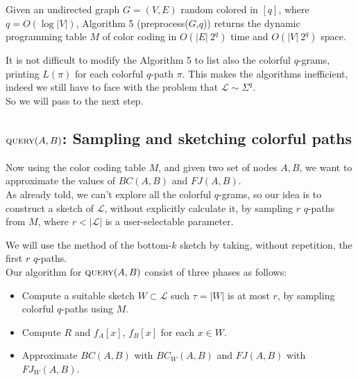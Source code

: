 \begin{lemma}
	Given an undirected graph $G=(V, E)$ random colored in $[q]$, where $q = O(\log |V|)$, Algorithm 5 (preprocess($G$,$q$))
	returns the dynamic programming table $M$ of color coding in $O(|E|\ 2^{q})$ time and $O(|V|\ 2^{q})$ space. 
\end{lemma}

It is not difficult to modify the Algorithm 5 to list also the colorful $q$-grams, printing $L(\pi)$ for each colorful $q$-path $\pi$.
This makes the algorithms inefficient, indeed we still have to face with the problem that $\mathcal{L} \sim \Sigma^{q}$. \\

So we will pass to the next step.

\subsection*{$\textsc{query}(A,B)$: Sampling and sketching colorful paths}

Now using the color coding table $M$, and given two set of nodes $A, B$, 
we want to approximate the values of $BC(A,B)$ and $FJ(A,B)$.\\

As already told, we can't explore all the colorful $q$-grams, so our idea is to 
construct a sketch of $\mathcal{L}$, without explicitly calculate it, 
by sampling $r$ $q$-paths from $M$, where $r < |\mathcal{L}|$ is a user-selectable parameter.

We will use the method of the bottom-$k$ sketch by taking, without repetition, the first $r$ $q$-paths. \\

Our algorithm for $\textsc{query}(A,B)$ consist of three phases as follows:

\begin{itemize}
	\item Compute a suitable sketch $W \subset \mathcal{L}$ such $\tau = |W|$ is at most $r$, by sampling colorful $q$-paths using $M$.
	\item Compute $R$ and $f_{A}[x]$, $f_{B}[x]$ for each $x \in W$.
	\item Approximate $BC(A,B)$ with $BC_{W}(A,B)$ and $FJ(A,B)$ with $FJ_{W}(A,B)$.
\end{itemize}

